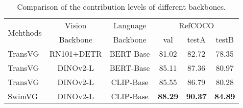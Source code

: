 \begin{table}[t]
\caption{Comparison of the contribution levels of different backbones.}
\centering

\small
\setlength{\tabcolsep}{3.5pt}

\begin{tabular}{l|cc|ccc}
\toprule

\multirow{2}{*}{Mehthods} & \multicolumn{1}{c}{Vision} & \multicolumn{1}{c|}{Language} & \multicolumn{3}{c}{RefCOCO} \\

 & Backbone & Backbone & val & testA & testB \\ \midrule
TransVG\cite{deng2021transvg} &RN101+DETR & BERT-Base & 81.02 & 82.72 & 78.35
\\
TransVG\cite{deng2021transvg} & DINOv2-L & BERT-Base  & 85.11 & 87.36  & 80.97
\\

TransVG\cite{deng2021transvg} & DINOv2-L & CLIP-Base & 85.55 & 86.79  & 80.28
\\
\hline
SwimVG & DINOv2-L & CLIP-Base & \textbf{88.29}  & \textbf{90.37 }&\textbf{84.89}
\\
\bottomrule
\end{tabular}


\vspace{-2mm}
\label{Table:backbone}
\end{table}